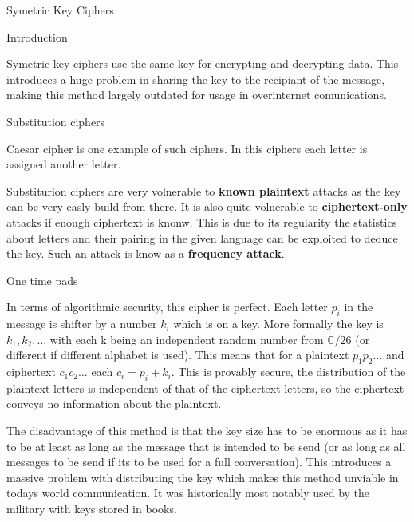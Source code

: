 \documentclass[12pt, letterpaper]{article}
\begin{document}
\begin{section}{Symetric Key Ciphers}

  \begin{subsection}{Introduction}

    Symetric key ciphers use the same key for encrypting and decrypting data.
    This introduces a huge problem in sharing the key to the recipiant of the
    message, making this method largely outdated for usage in overinternet
    comunications.

  \end{subsection}

  \begin{subsection}{Substitution ciphers}

    Caesar cipher is one example of such ciphers. In this ciphers each letter is
    assigned another letter.

    Substiturion ciphers are very volnerable to \textbf{known plaintext} attacks
    as the key can be very easly build from there. It is also quite volnerable
    to \textbf{ciphertext-only} attacks if enough ciphertext is knonw. This is
    due to its regularity the statistics about letters and their pairing in the
    given language can be exploited to deduce the key. Such an attack is know
    as a \textbf{frequency attack}.

  \end{subsection}

  \begin{subsection}{One time pads}

    In terms of algorithmic security, this cipher is perfect. Each letter
    \(p_{i}\) in the message is shifter by a number \(k_{i}\) which is on a key.
    More formally the key is \(k_{1}, k_{2}, \dots\) with each k being an
    independent random number from \(\mathbb{C}/26\) (or different if different
    alphabet is used). This means that for a plaintext \(p_{1}p_{2} \dots\) and
    ciphertext \(c_{1}c_{2} \dots\) each \(c_{i} = p_{i} + k_{i}\). This is
    provably secure, the distribution of the plaintext letters is independent of
    that of the ciphertext letters, so the ciphertext conveys no information
    about the plaintext.

    The disadvantage of this method is that the key size has to be enormous as
    it has to be at least as long as the message that is intended to be send (or
    as long as all messages to be send if its to be used for a full
    conversation). This introduces a massive problem with distributing the key
    which makes this method unviable in todays world communication. It was
    historically most notably used by the military with keys stored in books.


\end{subsection}
\end{section}
\end{document}
